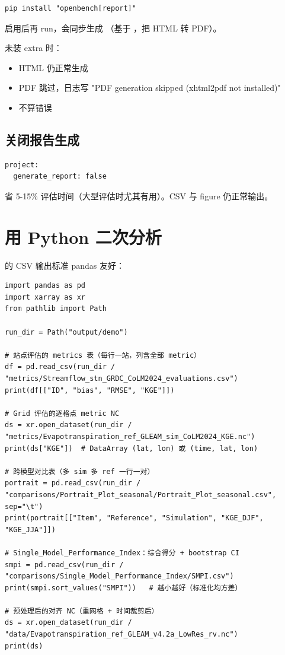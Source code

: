 \begin{verbatim}
pip install "openbench[report]"
\end{verbatim}

启用后再 run，会同步生成 （基于 ，把 HTML 转 PDF）。

未装 \cli{[report]} extra 时：

\begin{itemize}
  \item HTML 仍正常生成
  \item PDF 跳过，日志写 "PDF generation skipped (xhtml2pdf not installed)"
  \item 不算错误
\end{itemize}

\subsection{关闭报告生成}

\begin{verbatim}
project:
  generate_report: false
\end{verbatim}

省 5-15\% 评估时间（大型评估时尤其有用）。CSV 与 figure 仍正常输出。

\section{用 Python 二次分析}

\openbench{} 的 CSV 输出标准 pandas 友好：

\begin{verbatim}
import pandas as pd
import xarray as xr
from pathlib import Path

run_dir = Path("output/demo")

# 站点评估的 metrics 表（每行一站，列含全部 metric）
df = pd.read_csv(run_dir / "metrics/Streamflow_stn_GRDC_CoLM2024_evaluations.csv")
print(df[["ID", "bias", "RMSE", "KGE"]])

# Grid 评估的逐格点 metric NC
ds = xr.open_dataset(run_dir / "metrics/Evapotranspiration_ref_GLEAM_sim_CoLM2024_KGE.nc")
print(ds["KGE"])  # DataArray (lat, lon) 或 (time, lat, lon)

# 跨模型对比表（多 sim 多 ref 一行一对）
portrait = pd.read_csv(run_dir / "comparisons/Portrait_Plot_seasonal/Portrait_Plot_seasonal.csv", sep="\t")
print(portrait[["Item", "Reference", "Simulation", "KGE_DJF", "KGE_JJA"]])

# Single_Model_Performance_Index：综合得分 + bootstrap CI
smpi = pd.read_csv(run_dir / "comparisons/Single_Model_Performance_Index/SMPI.csv")
print(smpi.sort_values("SMPI"))   # 越小越好（标准化均方差）

# 预处理后的对齐 NC（重网格 + 时间裁剪后）
ds = xr.open_dataset(run_dir / "data/Evapotranspiration_ref_GLEAM_v4.2a_LowRes_rv.nc")
print(ds)
\end{verbatim}

